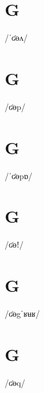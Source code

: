 \documentclass[10pt,a4paper,twoside]{book}
\begin{document}
\section*{G}

\begin{multicols}{3}
 {/ˈʛɵʌ/} {}
\end{multicols}

\section*{G}

\begin{multicols}{3}
 {/ʛɵp/} {}
\end{multicols}

\section*{G}

\begin{multicols}{3}
 {/ˈʛɵpɒ/} {}
\end{multicols}

\section*{G}

\begin{multicols}{3}
 {/ʛɵǃ/} {}
\end{multicols}

\section*{G}

\begin{multicols}{3}
 {/ʛɵgˈʁʉʁ/} {}
\end{multicols}

\section*{G}

\begin{multicols}{3}
 {/ʛɵq/} {}
\end{multicols}
\end{document}
